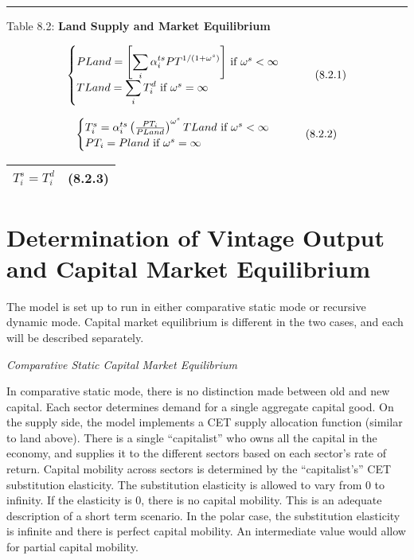 \documentclass[12pt]{article}
\begin{document}
\noindent\rule{\linewidth}{0.4pt}
\begin{center}
\begin{large}
{\centering Table 8.2: \textbf{Land Supply and Market Equilibrium} \par}

\begin{equation}
    \begin{cases}
      $$PLand = \left[\displaystyle \sum_i \alpha^{ts}_i PT^{1/(1+\omega^s)} \right]$$ \text{ if } $$\omega^s < \infty$$\\
      $$TLand = \displaystyle \sum_i T^d_i$$ \text{ if } $$\omega^s = \infty$$\\
    \end{cases}
    \tag{8.2.1}
\end{equation}

\begin{equation}
    \begin{cases}
      $$T^s_i = \alpha^{ts}_i \left(\frac{PT_i}{PLand} \right)^{\omega^s} TLand$$ \text{ if } $$\omega^s < \infty$$\\
      $$PT_i = Pland$$ \text{ if } $$\omega^s = \infty$$\\
    \end{cases}
    \tag{8.2.2}
\end{equation}

\begin{tabular}{>{\raggedright}p{} l}

$T^s_i = T^d_i$ & (8.2.3)\\[15pt]

\hline
\end{tabular}
\end{large}
\end{center}

\section{Determination of Vintage Output and Capital Market Equilibrium}

The model is set up to run in either comparative static mode or recursive dynamic mode. Capital market equilibrium is different in the two cases, and each will be described separately.

\textit{Comparative Static Capital Market Equilibrium}

In comparative static mode, there is no distinction made between old and new capital. Each sector determines demand for a single aggregate capital good. On the supply side, the model implements a CET supply allocation function (similar to land above). There is a single “capitalist” who owns all the capital in the economy, and supplies it to the different sectors based on each sector’s rate of return. Capital mobility across sectors is determined by the “capitalist’s” CET substitution elasticity. The substitution elasticity is allowed to vary from 0 to infinity. If the elasticity is 0, there is no capital mobility. This is an adequate description of a short term scenario. In the polar case, the substitution elasticity is infinite and there is perfect capital mobility. An intermediate value would allow for partial capital mobility.
\end{document}

